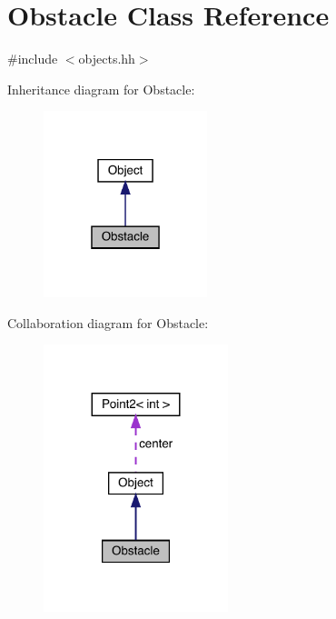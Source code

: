 \hypertarget{class_obstacle}{}\section{Obstacle Class Reference}
\label{class_obstacle}


{\ttfamily \#include $<$objects.\+hh$>$}



Inheritance diagram for Obstacle\+:
\nopagebreak
\begin{figure}[H]
\begin{center}
\leavevmode
\includegraphics[width=135pt]{class_obstacle__inherit__graph}
\end{center}
\end{figure}


Collaboration diagram for Obstacle\+:
\nopagebreak
\begin{figure}[H]
\begin{center}
\leavevmode
\includegraphics[width=152pt]{class_obstacle__coll__graph}
\end{center}
\end{figure}
